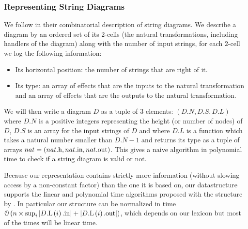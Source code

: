 \subsubsection{Representing String Diagrams}
We follow \cite{delpeuchNormalizationPlanarString2022} in their combinatorial
description of string diagrams.
We describe a diagram by an ordered set of its $2$-cells (the natural
transformations, including handlers of the diagram) along with the number of
input strings, for each $2$-cell we log the following information:
\begin{itemize}
	\item Its horizontal position: the number of strings that are right of it.
	\item Its type: an array of effects that are the inputs to the natural
	      transformation and an array of effects that are the outputs to the
	      natural transformation.
\end{itemize}
We will then write a diagram $D$ as a tuple of $3$ elements:
$\left( D.N, D.S, D.L \right)$ where $D.N$ is a positive integers representing the
height (or number of nodes) of $D$, $D.S$ is an array for the input strings of $D$ and
where $D.L$ is a function which takes a natural number smaller than $D.N - 1$ and
returns its type as a tuple of arrays
$nat = \left( nat\mathrm{.h}, nat\mathrm{.in}, nat\mathrm{.out} \right)$.
This gives a naive algorithm in polynomial time to check if a string diagram is
valid or not.

\smallskip

Because our representation contains strictly more information (without slowing
access by a non-constant factor) than the one it is based on, our
datastructure supports the linear and polynomial time algorithms proposed with
the structure by \cite{delpeuchNormalizationPlanarString2022}.
In particular our structure can be normalized in time
$\mathcal{O}\left( n \times \sup_{i} \left|D\mathrm{.L}\left(i\right)\mathrm{.in}\right| + \left|D\mathrm{.L}\left(i\right)\mathrm{.out}\right|
	\right)$, which depends on our lexicon but most of the times will be linear
time.

